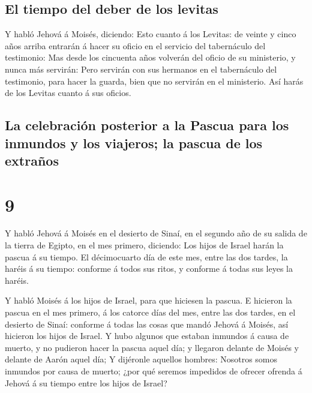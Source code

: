 \hypertarget{el-tiempo-del-deber-de-los-levitas}{%
\subsection{El tiempo del deber de los
levitas}\label{el-tiempo-del-deber-de-los-levitas}}

 Y habló Jehová á Moisés, diciendo:  Esto
cuanto á los Levitas: de veinte y cinco años arriba entrarán á hacer su
oficio en el servicio del tabernáculo del testimonio:  Mas
desde los cincuenta años volverán del oficio de su ministerio, y nunca
más servirán:  Pero servirán con sus hermanos en el
tabernáculo del testimonio, para hacer la guarda, bien que no servirán
en el ministerio. Así harás de los Levitas cuanto á sus oficios.

\hypertarget{la-celebraciuxf3n-posterior-a-la-pascua-para-los-inmundos-y-los-viajeros-la-pascua-de-los-extrauxf1os}{%
\subsection{La celebración posterior a la Pascua para los inmundos y los
viajeros; la pascua de los
extraños}\label{la-celebraciuxf3n-posterior-a-la-pascua-para-los-inmundos-y-los-viajeros-la-pascua-de-los-extrauxf1os}}

\hypertarget{section-8}{%
\section{9}\label{section-8}}

 Y habló Jehová á Moisés en el desierto de Sinaí, en el
segundo año de su salida de la tierra de Egipto, en el mes primero,
diciendo:  Los hijos de Israel harán la pascua á su tiempo.
 El décimocuarto día de este mes, entre las dos tardes, la
haréis á su tiempo: conforme á todos sus ritos, y conforme á todas sus
leyes la haréis.

 Y habló Moisés á los hijos de Israel, para que hiciesen la
pascua.  E hicieron la pascua en el mes primero, á los
catorce días del mes, entre las dos tardes, en el desierto de Sinaí:
conforme á todas las cosas que mandó Jehová á Moisés, así hicieron los
hijos de Israel.  Y hubo algunos que estaban inmundos á
causa de muerto, y no pudieron hacer la pascua aquel día; y llegaron
delante de Moisés y delante de Aarón aquel día;  Y dijéronle
aquellos hombres: Nosotros somos inmundos por causa de muerto; ¿por qué
seremos impedidos de ofrecer ofrenda á Jehová á su tiempo entre los
hijos de Israel?

